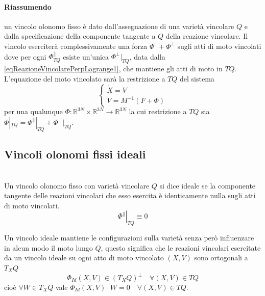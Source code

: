 \documentclass[11pt,a4paper,twoside]{book}
\newenvironment{definizione}[1][\empty]{\begin{Definizione}{
\ifx\empty#1\relax\else\mdseries\itshape#1\\\fi
}{}}{\end{Definizione}}
\theoremstyle{esss}
\theoremstyle{dotless}
\numberwithin{equation}{section} %
\begin{document}
\paragraph{Riassumendo} un vincolo olonomo fisso è dato dall'assegnazione di una varietà vincolare $Q$ e dalla specificazione della componente tangente a $Q$ della reazione vincolare. Il vincolo eserciterà complessivamente una forza $\Phi^\parallel+\Phi^\perp$ sugli atti di moto vincolati dove per ogni $\Phi^\parallel_{TQ}$ esiste un'unica $\Phi^\perp|_{TQ}$, data dalla \eqref{eqReazioneVincolarePerpLagrange1}, che mantiene gli atti di moto in $TQ$.
L'equazione del moto vincolato sarà la restrizione a $TQ$ del sistema \[
\begin{cases} \dot{X}=V \\ \dot{V}=M^{-1}(F+\Phi)\end{cases}
\] per una qualunque $\Phi:\mathbb{R}^{3N}\times\mathbb{R}^{3N}\rightarrow\mathbb{R}^{3N}$ la cui restrizione a $TQ$ sia $\Phi|_{TQ}=\Phi^\parallel|_{TQ} +\Phi^\perp|_{TQ}$.


\subsection{Vincoli olonomi fissi ideali}
\begin{definizione}
Un vincolo olonomo fisso con varietà vincolare $Q$ si dice ideale se la componente tangente delle reazioni vincolari che esso esercita è identicamente nulla sugli atti di moto vincolati.
\[\left.\Phi^\parallel\right|_{TQ}\equiv0\]
\end{definizione}

Un vincolo ideale mantiene le configurazioni sulla varietà senza però influenzare in alcun modo il moto lungo $Q$, questo significa che le reazioni vincolari esercitate da un vincolo ideale su ogni atto di moto vincolato $(X,V)$ sono ortogonali\footnotemark{} a $T_XQ$
\begin{equation}
\Phi_{Id}(X,V)\in \left( T_XQ \right)^\perp \quad \forall (X,V)\in TQ
\end{equation}
cioè $\forall W\in T_XQ$ vale $\Phi_{Id}(X,V)\cdot W =0 \quad \forall (X,V)\in TQ$.

\end{document}
